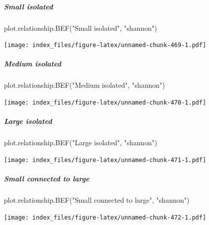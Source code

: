 \documentclass[
]{article}
\newenvironment{Shaded}{\begin{snugshade}}{\end{snugshade}}
\newcommand{\FunctionTok}[1]{\textcolor[rgb]{0.00,0.00,0.00}{#1}}
\newcommand{\NormalTok}[1]{#1}
\newcommand{\StringTok}[1]{\textcolor[rgb]{0.31,0.60,0.02}{#1}}
\begin{document}
\hypertarget{small-isolated-1}{%
\subparagraph{Small isolated}\label{small-isolated-1}}

\begin{Shaded}
\begin{Highlighting}[]
\FunctionTok{plot.relationship.BEF}\NormalTok{(}\StringTok{"Small isolated"}\NormalTok{,}
                      \StringTok{"shannon"}\NormalTok{)}
\end{Highlighting}
\end{Shaded}

\texttt{[image: index\_files/figure-latex/unnamed-chunk-469-1.pdf]}

\hypertarget{medium-isolated-1}{%
\subparagraph{Medium isolated}\label{medium-isolated-1}}

\begin{Shaded}
\begin{Highlighting}[]
\FunctionTok{plot.relationship.BEF}\NormalTok{(}\StringTok{"Medium isolated"}\NormalTok{,}
                      \StringTok{"shannon"}\NormalTok{)}
\end{Highlighting}
\end{Shaded}

\texttt{[image: index\_files/figure-latex/unnamed-chunk-470-1.pdf]}

\hypertarget{large-isolated-1}{%
\subparagraph{Large isolated}\label{large-isolated-1}}

\begin{Shaded}
\begin{Highlighting}[]
\FunctionTok{plot.relationship.BEF}\NormalTok{(}\StringTok{"Large isolated"}\NormalTok{,}
                      \StringTok{"shannon"}\NormalTok{)}
\end{Highlighting}
\end{Shaded}

\texttt{[image: index\_files/figure-latex/unnamed-chunk-471-1.pdf]}

\hypertarget{small-connected-to-large-1}{%
\subparagraph{Small connected to
large}\label{small-connected-to-large-1}}

\begin{Shaded}
\begin{Highlighting}[]
\FunctionTok{plot.relationship.BEF}\NormalTok{(}\StringTok{"Small connected to large"}\NormalTok{,}
                      \StringTok{"shannon"}\NormalTok{)}
\end{Highlighting}
\end{Shaded}

\texttt{[image: index\_files/figure-latex/unnamed-chunk-472-1.pdf]}
\end{document}
